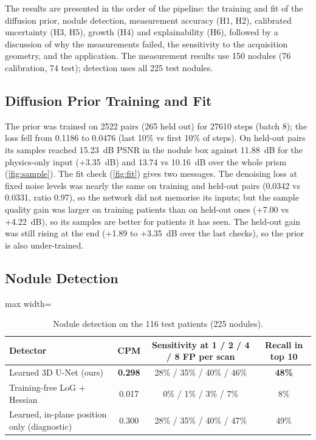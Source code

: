 The results are presented in the order of the pipeline: the training and fit of the diffusion prior, nodule detection, measurement accuracy (H1, H2), calibrated uncertainty (H3, H5), growth (H4) and explainability (H6), followed by a discussion of why the measurements failed, the sensitivity to the acquisition geometry, and the application. The measurement results use 150 nodules (76 calibration, 74 test); detection uses all 225 test nodules.

\subsection{Diffusion Prior Training and Fit}

The prior was trained on \num{2522} pairs (265 held out) for \num{27610} steps (batch 8); the loss fell from 0.1186 to 0.0476 (last 10\% vs first 10\% of steps). On held-out pairs its samples reached 15.23~dB PSNR in the nodule box against 11.88~dB for the physics-only input (+3.35~dB) and 13.74 vs 10.16~dB over the whole prism (\cref{fig:sample}). The fit check (\cref{fig:fit}) gives two messages. The denoising loss at fixed noise levels was nearly the same on training and held-out pairs (0.0342 vs 0.0331, ratio 0.97), so the network did not memorise its inputs; but the sample quality gain was larger on training patients than on held-out ones (+7.00 vs +4.22~dB), so its samples are better for patients it has seen. The held-out gain was still rising at the end (+1.89 to +3.35~dB over the last checks), so the prior is also under-trained.


\subsection{Nodule Detection}

\begin{table}[!htbp]
\centering\small
\caption{Nodule detection on the 116 test patients (225 nodules).}
\label{tab:detection}
\begin{adjustbox}{max width=\linewidth}
\begin{tabular}{lccc}
\toprule
Detector & CPM & Sensitivity at 1 / 2 / 4 / 8 FP per scan & Recall in top 10 \\
\midrule
Learned 3D U-Net (ours) & \textbf{0.298} & 28\% / 35\% / 40\% / 46\% & \textbf{48\%} \\
Training-free LoG + Hessian & 0.017 & 0\% / 1\% / 3\% / 7\% & 8\% \\
Learned, in-plane position only (diagnostic) & 0.300 & 28\% / 35\% / 40\% / 47\% & 49\% \\
\bottomrule
\end{tabular}
\end{adjustbox}
\end{table}

